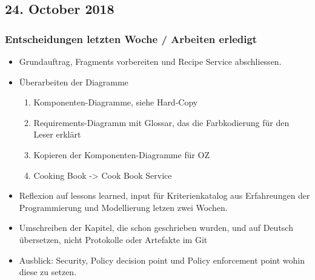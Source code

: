 \documentclass{article}
\begin{document}
    
\subsection{24. October 2018} \label{chap:Protokols:24oct2018}

\subsubsection{Entscheidungen letzten Woche / Arbeiten erledigt}
\begin{itemize}
    \item Grundauftrag, Fragments vorbereiten und Recipe Service abschliessen. \checkmark
    \item Überarbeiten der Diagramme \checkmark
        \begin{enumerate}
            \item Komponenten-Diagramme, siehe Hard-Copy \checkmark
            \item Requirements-Diagramm mit Glossar, das die Farbkodierung für den Leser erklärt \checkmark
            \item Kopieren der Komponenten-Diagramme für OZ \checkmark
            \item Cooking Book -> Cook Book Service \checkmark
        \end{enumerate}
    \item Reflexion auf lessons learned, input für Kriterienkatalog aus Erfahreungen der Programmierung und Modellierung letzen zwei Wochen.
    \item Umschreiben der Kapitel, die schon geschrieben wurden, und auf Deutsch übersetzen, nicht Protokolle oder Artefakte im Git
    \item Ausblick: Security, Policy decision point und Policy enforcement point wohin diese zu setzen.
\end{itemize}
\end{document}
